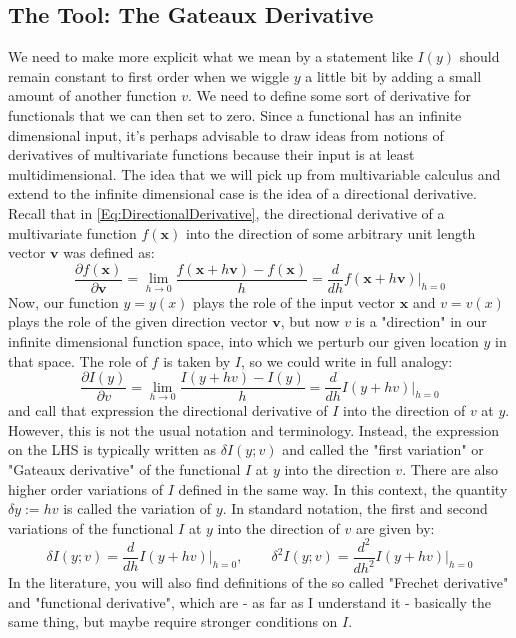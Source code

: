 \subsection{The Tool: The Gateaux Derivative}
We need to make more explicit what we mean by a statement like $I(y)$ should remain constant to first order when we wiggle $y$ a little bit by adding a small amount of another function $v$. We need to define some sort of derivative for functionals that we can then set to zero. Since a functional has an infinite dimensional input, it's perhaps advisable to draw ideas from notions of derivatives of multivariate functions because their input is at least multidimensional. The idea that we will pick up from multivariable calculus and extend to the infinite dimensional case is the idea of a directional derivative. Recall that in \ref{Eq:DirectionalDerivative}, the directional derivative of a multivariate function $f(\mathbf{x})$ into the direction of some arbitrary unit length vector $\mathbf{v}$ was defined as:
\begin{equation}
 \frac{\partial f(\mathbf{x}) }{\partial \mathbf{v}} 
 = \lim_{h \rightarrow 0} \frac{f(\mathbf{x} + h \mathbf{v} ) - f(\mathbf{x})}{h}
 = \frac{d}{d h} f(\mathbf{x} + h \mathbf{v}) \bigg\rvert_{h=0}
\end{equation}
Now, our function $y = y(x)$ plays the role of the input vector $\mathbf{x}$ and $v = v(x)$ plays the role of  the given direction vector $\mathbf{v}$, but now $v$ is a "direction" in our infinite dimensional function space, into which we perturb our given location $y$ in that space. The role of $f$ is taken by $I$, so we could write in full analogy:
\begin{equation}
 \frac{\partial I(y) }{\partial v} 
 = \lim_{h \rightarrow 0} \frac{I(y + h v ) - I(y)}{h}
 = \frac{d}{d h} I(y + h v) \bigg\rvert_{h=0}
\end{equation}
and call that expression the directional derivative of $I$ into the direction of $v$ at $y$. However, this is not the usual notation and terminology. Instead, the expression on the LHS is typically written as $\delta I(y;v)$ and called the "first variation" or  "Gateaux derivative" of the functional $I$ at $y$ into the direction $v$. There are also higher order variations of $I$ defined in the same way. In this context, the quantity $\delta y := h v$ is called the variation of $y$.  In standard notation, the first and second variations of the functional $I$ at $y$ into the direction of $v$ are given by:
\begin{equation}
 \delta   I(y; v) = \frac{d}  {d h  } I(y + h v) \bigg\rvert_{h=0}, \qquad
 \delta^2 I(y; v) = \frac{d^2}{d h^2} I(y + h v) \bigg\rvert_{h=0}
\end{equation}
In the literature, you will also find definitions of the so called "Frechet derivative" and "functional derivative", which are - as far as I understand it - basically the same thing, but maybe require stronger conditions on $I$.

